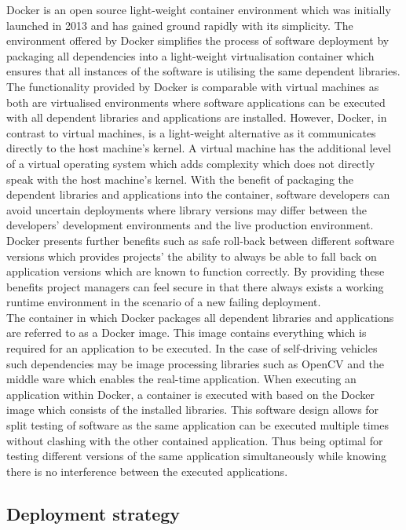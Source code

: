 Docker is an open source light-weight container environment which was initially launched in 2013 and has gained ground rapidly with its simplicity. The environment offered by Docker simplifies the process of software deployment by packaging all dependencies into a light-weight virtualisation container which ensures that all instances of the software is utilising the same dependent libraries. The functionality provided by Docker is comparable with virtual machines as both are virtualised environments where software applications can be executed with all dependent libraries and applications are installed. However, Docker, in contrast to virtual machines, is a light-weight alternative as it communicates directly to the host machine's kernel. A virtual machine has the additional level of a virtual operating system which adds complexity which does not directly speak with the host machine's kernel. With the benefit of packaging the dependent libraries and applications into the container, software developers can avoid uncertain deployments where library versions may differ between the developers' development environments and the live production environment. Docker presents further benefits such as safe roll-back between different software versions which provides projects' the ability to always be able to fall back on application versions which are known to function correctly. By providing these benefits project managers can feel secure in that there always exists a working runtime environment in the scenario of a new failing deployment.\\

The container in which Docker packages all dependent libraries and applications are referred to as a Docker image. This image contains everything which is required for an application to be executed. In the case of self-driving vehicles such dependencies may be image processing libraries such as OpenCV and the middle ware which enables the real-time application. When executing an application within Docker, a container is executed with based on the Docker image which consists of the installed libraries. This software design allows for split testing of software as the same application can be executed multiple times without clashing with the other contained application. Thus being optimal for testing different versions of the same application simultaneously while knowing there is no interference between the executed applications.\\

\subsection{Deployment strategy}

